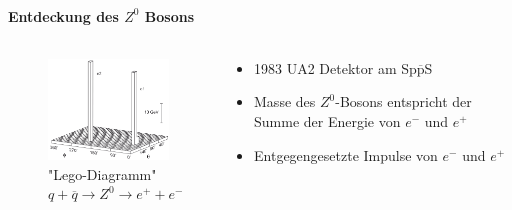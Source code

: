 \begin{iframe}
	\framesubtitle{Entdeckung des $Z^0$ Bosons}
	\begin{columns}
		\begin{column}{0.48\textwidth}
			\begin{figure}
				\includegraphics[width=5cm]{img/lego}
				\caption*{"Lego-Diagramm" $q+\overline{q} \rightarrow Z^0 \rightarrow e^+ + e^-$ \cite{povh}}
			\end{figure}
		\end{column}
		\begin{column}{0.48\textwidth}
				\begin{itemize}
					\item 1983 UA2 Detektor am Sp$\overline{\text{p}}$S
					\item Masse des $Z^0$-Bosons entspricht der Summe der Energie von $e^-$ und $e^+$
					\item Entgegengesetzte Impulse von $e^-$ und $e^+$
				\end{itemize}
		\end{column}
		\end{columns}
\end{iframe}



